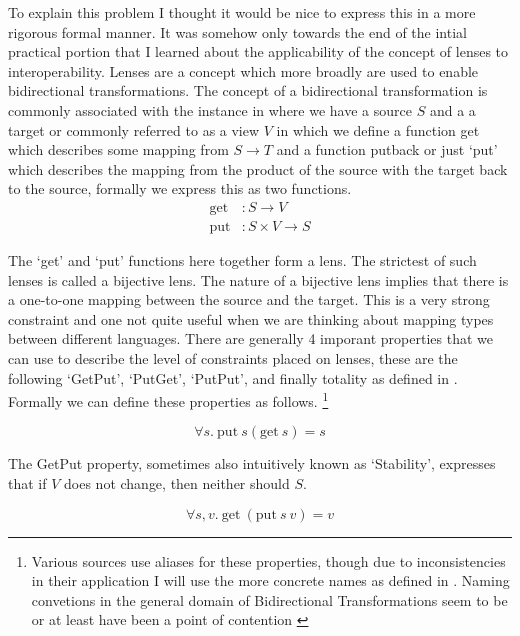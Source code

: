 \documentclass[10pt]{article}
\begin{document}
To explain this problem I thought it would be nice to express this in a more rigorous formal manner. It was somehow only towards the end of the intial practical portion that I learned about the applicability of the concept of lenses to interoperability. Lenses are a concept which more broadly are used to enable bidirectional transformations. The concept of a bidirectional transformation is commonly associated with the instance in where we have a source $S$ and a a target or commonly referred to as a view $V$ in which we define a function get which describes some mapping from $S \rightarrow T$ and a function putback or just `put' which describes the mapping from the product of the source with the target back to the source, formally we express this as two functions.
\begin{align}
  \text{get} & : S \rightarrow V \\
  \text{put} & : S \times V \rightarrow S
\end{align}

The `get' and `put' functions here together form a lens. The strictest of such lenses is called a bijective lens. The nature of a bijective lens implies that there is a one-to-one mapping between the source and the target. This is a very strong constraint and one not quite useful when we are thinking about mapping types between different languages. There are generally 4 imporant properties that we can use to describe the level of constraints placed on lenses, these are the following `GetPut', `PutGet', `PutPut', and finally totality as defined in \cite{foster2008semantics}. Formally we can define these properties as follows. \footnote{
  Various sources use aliases for these properties, though due to inconsistencies in their application I will use the more concrete names as defined in \cite{foster2008semantics}. Naming convetions in the general domain of Bidirectional Transformations seem to be or at least have been a point of contention \cite{Czarnecki2009BidirectionalTA}
}

\begin{definition}[GetPut]
  \[
    \forall s.\ \text{put}\ s (\text{get}\ s) = s
  \]
\end{definition}

The GetPut property, sometimes also intuitively known as `Stability', expresses that if $V$ does not change, then neither should $S$.

\begin{definition}[PutGet]
  \[
    \forall s,v.\ \text{get}\ (\text{put}\ s\ v) = v
  \]
\end{definition}
\end{document}
